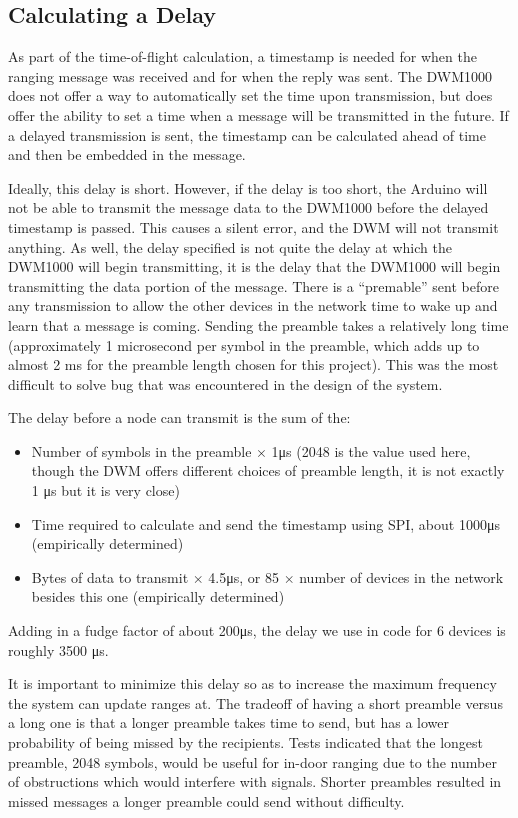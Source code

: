 \subsection{Calculating a Delay}
\label{CalculatingADelay}
As part of the time-of-flight calculation, a timestamp is needed for when the ranging message was received and for when the reply was sent. The DWM1000 does not offer a way to automatically set the time upon transmission, but does offer the ability to set a time when a message will be transmitted in the future. If a delayed transmission is sent, the timestamp can be calculated ahead of time and then be embedded in the message.

Ideally, this delay is short. However, if the delay is too short, the Arduino will not be able to transmit the message data to the DWM1000 before the delayed timestamp is passed. This causes a silent error, and the DWM will not transmit anything. As well, the delay specified is not quite the delay at which the DWM1000 will begin transmitting, it is the delay that the DWM1000 will begin transmitting the data portion of the message. There is a ``premable'' sent before any transmission to allow the other devices in the network time to wake up and learn that a message is coming. Sending the preamble takes a relatively long time (approximately 1 microsecond per symbol in the preamble, which adds up to almost 2 ms for the preamble length chosen for this project). This was the most difficult to solve bug that was encountered in the design of the system.

The delay before a node can transmit is the sum of the:
\begin{itemize}
	\item Number of symbols in the preamble $\times$ 1\si{\micro\second} (2048 is the value used here, though the DWM offers different choices of preamble length, it is not exactly 1 \si{\micro\second} but it is very close)
	\item Time required to calculate and send the timestamp using SPI, about 1000\si{\micro\second} (empirically determined)
	\item Bytes of data to transmit $\times$ 4.5\si{\micro\second}, or 85 $\times$ number of devices in the network besides this one (empirically determined)
\end{itemize}

Adding in a fudge factor of about 200\si{\micro\second}, the delay we use in code for 6 devices is roughly 3500 \si{\micro\second}.

It is important to minimize this delay so as to increase the maximum frequency the system can update ranges at. The tradeoff of having a short preamble versus a long one is that a longer preamble takes time to send, but has a lower probability of being missed by the recipients. Tests indicated that the longest preamble, 2048 symbols, would be useful for in-door ranging due to the number of obstructions which would interfere with signals.  Shorter preambles resulted in missed messages a longer preamble could send without difficulty.

